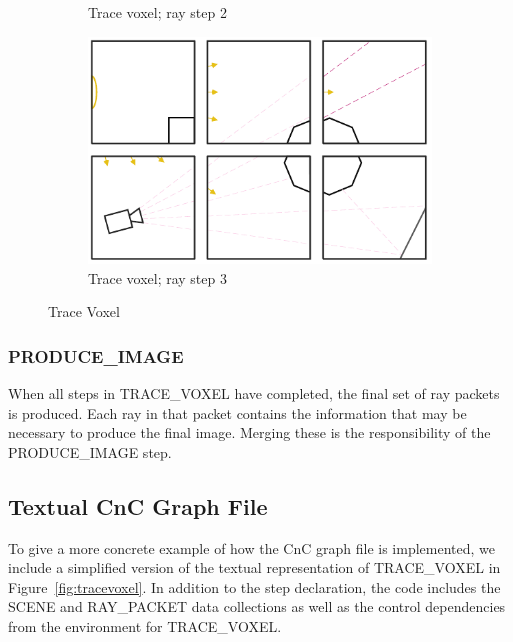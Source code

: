 \begin{figure}[!htb]
\begin{subfigure}{.49\columnwidth}
  \caption{Trace voxel; ray step 2}
\end{subfigure}
\begin{subfigure}{.49\columnwidth}
 \centering
  \includegraphics[width=.98\columnwidth]{drawings/Trace4.pdf}
  \caption{Trace voxel; ray step 3}
\end{subfigure}
\caption{Trace Voxel}
\label{fig:trace}
\end{figure}

\subsubsection{PRODUCE\_IMAGE}
When all steps in TRACE\_VOXEL have completed, the final set of ray
packets is produced. Each ray in that packet contains the information
that may be necessary to produce the final image. Merging these is the
responsibility of the PRODUCE\_IMAGE step.

\subsection{Textual CnC Graph File}
To give a more concrete example of how the CnC graph file is
implemented, we include a simplified version of the textual
representation of TRACE\_VOXEL in Figure~\ref{fig:tracevoxel}. In
addition to the step declaration, the code includes the SCENE and
RAY\_PACKET data collections as well as the control dependencies from
the environment for TRACE\_VOXEL.

